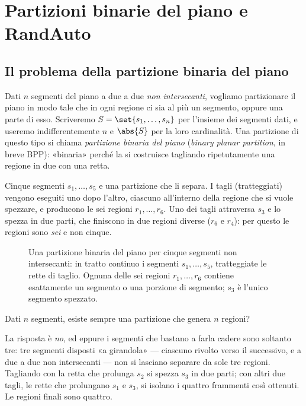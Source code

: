 \chapter{Partizioni binarie del piano e RandAuto}

\section{Il problema della partizione binaria del piano}


Dati $n$ segmenti del piano a due a due \emph{non intersecanti}, vogliamo partizionare il
piano in modo tale che in ogni regione ci sia al più un segmento, oppure una parte di esso.
Scriveremo $S=\set{s_1,\dots,s_n}$ per l'insieme dei segmenti dati, e useremo indifferentemente
$n$ e $\abs{S}$ per la loro cardinalità. Una partizione di questo tipo si chiama
\emph{partizione binaria del piano} (\emph{binary planar partition}, in breve BPP): «binaria»
perché la si costruisce tagliando ripetutamente una regione in due con una retta.

\begin{esempio}
Cinque segmenti $s_1,\dots,s_5$ e una partizione che li separa. I tagli (tratteggiati)
vengono eseguiti uno dopo l'altro, ciascuno all'interno della regione che si vuole spezzare,
e producono le sei regioni $r_1,\dots,r_6$. Uno dei tagli attraversa $s_3$ e lo spezza in due
parti, che finiscono in due regioni diverse ($r_6$ e $r_4$): per questo le regioni sono
\emph{sei} e non cinque.

\begin{figure}[H]
\centering

\caption{Una partizione binaria del piano per cinque segmenti non intersecanti: in tratto
continuo i segmenti $s_1,\dots,s_5$, tratteggiate le rette di taglio. Ognuna delle sei
regioni $r_1,\dots,r_6$ contiene esattamente un segmento o una porzione di segmento;
$s_3$ è l'unico segmento spezzato.}
\end{figure}
\end{esempio}

\begin{domanda}
Dati $n$ segmenti, esiste sempre una partizione che genera $n$ regioni?
\end{domanda}

La risposta è \emph{no}, ed eppure i segmenti che bastano a farla cadere sono soltanto tre:
tre segmenti disposti «a girandola» — ciascuno rivolto verso il successivo, e a due a due
non intersecanti — non si lasciano separare da sole tre regioni.
Tagliando con la retta che prolunga $s_2$ si spezza $s_3$ in due parti; con altri due tagli,
le rette che prolungano $s_1$ e $s_3$, si isolano i quattro frammenti così ottenuti. Le
regioni finali sono quattro.

